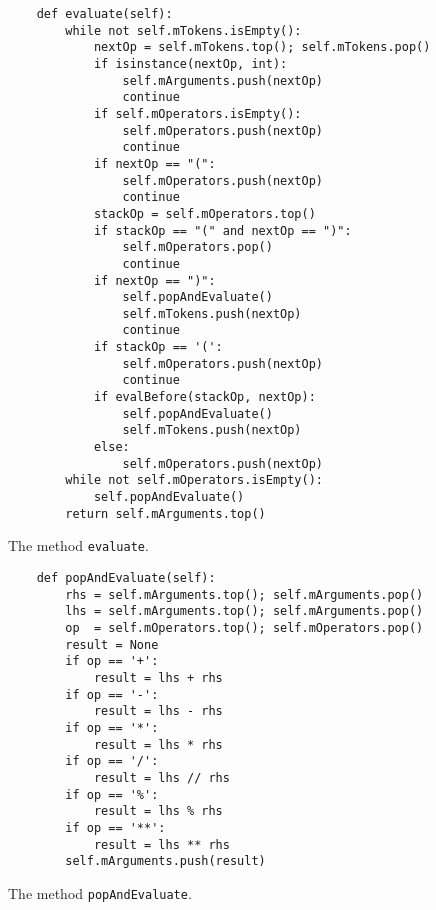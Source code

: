 \begin{figure}[!ht]
  \centering
\begin{verbatim}
    def evaluate(self):
        while not self.mTokens.isEmpty():
            nextOp = self.mTokens.top(); self.mTokens.pop()
            if isinstance(nextOp, int):
                self.mArguments.push(nextOp)
                continue
            if self.mOperators.isEmpty():
                self.mOperators.push(nextOp)
                continue
            if nextOp == "(":
                self.mOperators.push(nextOp)
                continue
            stackOp = self.mOperators.top()
            if stackOp == "(" and nextOp == ")":
                self.mOperators.pop()
                continue
            if nextOp == ")":
                self.popAndEvaluate()
                self.mTokens.push(nextOp)
                continue
            if stackOp == '(':
                self.mOperators.push(nextOp)
                continue
            if evalBefore(stackOp, nextOp):
                self.popAndEvaluate()
                self.mTokens.push(nextOp)
            else:
                self.mOperators.push(nextOp)
        while not self.mOperators.isEmpty():
            self.popAndEvaluate()
        return self.mArguments.top()
\end{verbatim}
\vspace*{-0.3cm}
  \caption{The method \texttt{evaluate}.}
  \label{fig:evaluate}
\end{figure} 

\begin{figure}[!ht]
\centering
\begin{verbatim}
    def popAndEvaluate(self):
        rhs = self.mArguments.top(); self.mArguments.pop()
        lhs = self.mArguments.top(); self.mArguments.pop()
        op  = self.mOperators.top(); self.mOperators.pop()
        result = None
        if op == '+':
            result = lhs + rhs
        if op == '-':
            result = lhs - rhs
        if op == '*':
            result = lhs * rhs
        if op == '/':
            result = lhs // rhs
        if op == '%':
            result = lhs % rhs
        if op == '**':
            result = lhs ** rhs
        self.mArguments.push(result)                
\end{verbatim}
\vspace*{-0.3cm}
\caption{The method \texttt{popAndEvaluate}.}
\label{fig:popAndEvaluate}
\end{figure}

